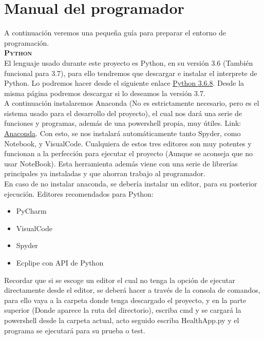 \section{Manual del programador}
A continuación veremos una pequeña guía para preparar el entorno de programación.\\
\textbf{\textsc{Python}}\\
El lenguaje usado durante este proyecto es Python, en su versión 3.6 (También funcional para 3.7), para ello tendremos que descargar e instalar el interprete de Python. Lo podremos hacer desde el siguiente enlace \href{https://www.python.org/downloads/release/python-368/}{Python 3.6.8}. Desde la misma página podremos descargar si lo deseamos la versión 3.7.\\
A continuación instalaremos Anaconda (No es estrictamente necesario, pero es el sistema usado para el desarrollo del proyecto), el cual nos dará una serie de funciones y programas, además de una powershell propia, muy útiles. Link: \href{https://www.anaconda.com/distribution/}{Anaconda}. Con esto, se nos instalará automáticamente tanto Spyder, como Notebook, y VisualCode. Cualquiera de estos tres editores son muy potentes y funcionan a la perfección para ejecutar el proyecto (Aunque se aconseja que no usar NoteBook). Esta herramienta además viene con una serie de librerías principales ya instaladas y que ahorran trabajo al programador.\\
En caso de no instalar anaconda, se debería instalar un editor, para su posterior ejecución. Editores recomendados para Python:
\begin{itemize}
\item PyCharm
\item VisualCode
\item Spyder
\item Ecplipe con API de Python
\end{itemize}
Recordar que si se escoge un editor el cual no tenga la opción de ejecutar directamente desde el editor, se deberá hacer a través de la consola de comandos, para ello vaya a la carpeta donde tenga descargado el proyecto, y en la parte superior (Donde aparece la ruta del directorio), escriba cmd y se cargará la powershell desde la carpeta actual, acto seguido escriba HealthApp.py y el programa se ejecutará para su prueba o test.\\


